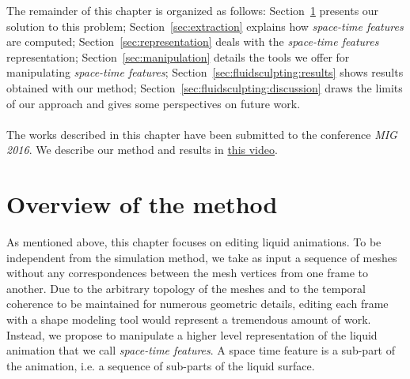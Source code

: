 The remainder of this chapter is organized as follows:
Section~\ref{sec:overview} presents our solution to this problem;
Section~\ref{sec:extraction} explains how \emph{space-time features} are computed; 
Section~\ref{sec:representation} deals with the \emph{space-time features} representation; 
Section~\ref{sec:manipulation} details the tools we offer for manipulating \emph{space-time features}; 
Section~\ref{sec:fluidsculpting:results} shows results obtained with our method; 
Section~\ref{sec:fluidsculpting:discussion} draws the limits of our approach and gives some perspectives on future work.
\\ \\
The works described in this chapter have been submitted to the conference \emph{MIG 2016}. We describe our method and results in \href{https://github.com/manteapi/manteapi.github.io/raw/master/publications/fluidSculpting_MIG_2016/video/fluidSculpting_mig2016.mp4}{this video}.

\section{Overview of the method}\label{sec:overview}
As mentioned above, this chapter focuses on editing liquid animations.
To be independent from the simulation method, we take as input a sequence of meshes without any correspondences between the mesh vertices from one frame to another. 
Due to the arbitrary topology of the meshes and to the temporal coherence to be maintained for numerous geometric details, editing each frame with a shape modeling tool would represent a tremendous amount of work.
Instead, we propose to manipulate a higher level representation of the liquid animation that we call \emph{space-time features}. A space time feature is a sub-part of the animation, i.e. a sequence of sub-parts of the liquid surface. 

